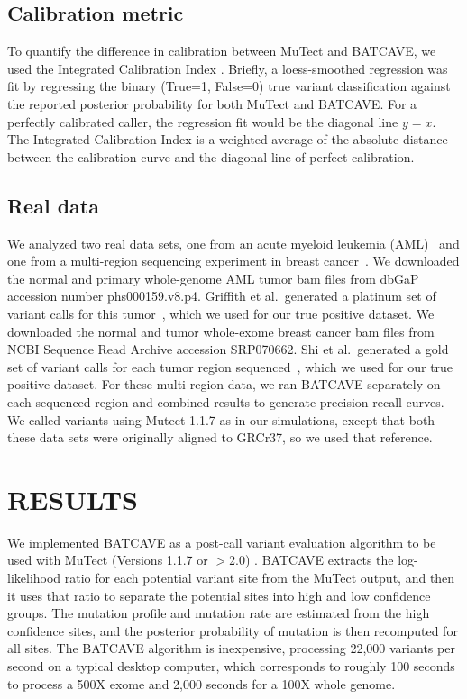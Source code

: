 \documentclass[a4,center,fleqn]{NAR}
\newcommand{\batcave}{BATCAVE\xspace}
\begin{document}
\subsection{Calibration metric}
To quantify the difference in calibration between MuTect and \batcave, we used the Integrated Calibration Index \cite{Austin2019}.
Briefly, a loess-smoothed regression was fit by regressing the binary (True=1, False=0) true variant classification against the reported posterior probability for both MuTect and \batcave.
For a perfectly calibrated caller, the regression fit would be the diagonal line $y=x$. 
The Integrated Calibration Index is a weighted average of the absolute distance between the calibration curve and the diagonal line of perfect calibration.

\subsection{Real data}
We analyzed two real data sets, one from an acute myeloid leukemia (AML)~\cite{Griffith2015} and one from a multi-region sequencing experiment in breast cancer~\cite{Shi2018}.
We downloaded the normal and primary whole-genome AML tumor bam files from dbGaP accession number phs000159.v8.p4.
Griffith et al.\ generated a platinum set of variant calls for this tumor~\cite{Griffith2015}, which we used for our true positive dataset.
We downloaded the normal and tumor whole-exome breast cancer bam files from NCBI Sequence Read Archive accession SRP070662.
Shi et al.\ generated a gold set of variant calls for each tumor region sequenced~\cite{Shi2018}, which we used for our true positive dataset.
For these multi-region data, we ran \batcave separately on each sequenced region and combined results to generate precision-recall curves.
We called variants using Mutect 1.1.7 as in our simulations, except that both these data sets were originally aligned to GRCr37, so we used that reference.


\section{RESULTS}
We implemented \batcave as a post-call variant evaluation algorithm to be used with MuTect (Versions 1.1.7 or $>$2.0) \cite{Cibulskis2013}.
\batcave extracts the log-likelihood ratio for each potential variant site from the MuTect output, and then it uses that ratio to separate the potential sites into high and low confidence groups.
The mutation profile and mutation rate are estimated from the high confidence sites, and the posterior probability of mutation is then recomputed for all sites.
The \batcave algorithm is inexpensive, processing 22,000 variants per second on a typical desktop computer, which corresponds to roughly 100 seconds to process a 500X exome and 2,000 seconds for a 100X whole genome.
\end{document}
